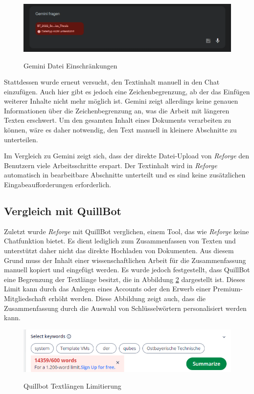 \begin{figure}[H]
\centering
\includegraphics[width=1\linewidth]{Images/Gemini_File.png}\\
\caption{Gemini Datei Einschränkungen}
\label{fig:Gemini_File}
\end{figure}

Stattdessen wurde erneut versucht, den Textinhalt manuell in den Chat einzufügen. Auch hier gibt es jedoch eine Zeichenbegrenzung, ab der das Einfügen weiterer Inhalte nicht mehr möglich ist. Gemini zeigt allerdings keine genauen Informationen über die Zeichenbegrenzung an, was die Arbeit mit längeren Texten erschwert. Um den gesamten Inhalt eines Dokuments verarbeiten zu können, wäre es daher notwendig, den Text manuell in kleinere Abschnitte zu unterteilen.

Im Vergleich zu Gemini zeigt sich, dass der direkte Datei-Upload von \textit{Reforge} den Benutzern viele Arbeitsschritte erspart. Der Textinhalt wird in \textit{Reforge} automatisch in bearbeitbare Abschnitte unterteilt und es sind keine zusätzlichen Eingabeaufforderungen erforderlich.

\subsection{Vergleich mit QuillBot}
Zuletzt wurde \textit{Reforge} mit QuillBot verglichen, einem Tool, das wie \textit{Reforge} keine Chatfunktion bietet. Es dient lediglich zum Zusammenfassen von Texten und unterstützt daher nicht das direkte Hochladen von Dokumenten. Aus diesem Grund muss der Inhalt einer wissenschaftlichen Arbeit für die Zusammenfassung manuell kopiert und eingefügt werden. Es wurde jedoch festgestellt, dass QuillBot eine Begrenzung der Textlänge besitzt, die in Abbildung \ref{fig:Quillbot_Limit} dargestellt ist. Dieses Limit kann durch das Anlegen eines Accounts oder den Erwerb einer Premium-Mitgliedschaft erhöht werden. Diese Abbildung zeigt auch, dass die Zusammenfassung durch die Auswahl von Schlüsselwörtern personalisiert werden kann.  

\begin{figure}[H]
\centering
\includegraphics[width=0.8\linewidth]{Images/Quillbot_Limit.png}\\
\caption{Quillbot Textlängen Limitierung}
\label{fig:Quillbot_Limit}
\end{figure}

